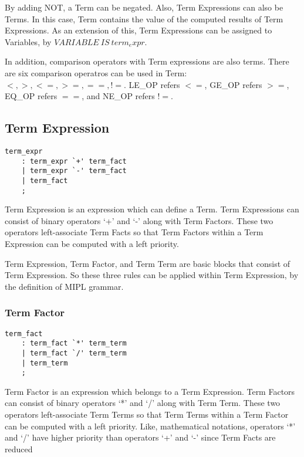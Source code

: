 \documentclass[prodmode,acmtecs]{acmsmall}
\begin{document}
By adding NOT, a Term can be negated. Also, Term Expressions can also be Terms.
In this case, Term contains the value of the computed results of Term Expressions.
As an extension of this, Term Expressions can be assigned to Variables,
by $VARIABLE\ IS\ term_expr$.
\medskip

In addition, comparison operators with Term expressions are also terms. There are six
comparison operatros can be used in Term: $<, >, <=, >=, ==, !=$. LE\_OP refers $<=$,
GE\_OP refers $>=$, EQ\_OP refers $==$, and NE\_OP refers $!=$.
\medskip


\subsection{Term Expression}
\begin{lstlisting}
term_expr
	: term_expr `+' term_fact
	| term_expr `-' term_fact
	| term_fact
	;
\end{lstlisting}

Term Expression is an expression which can define a Term.  Term 
Expressions can consist of binary operators `+' and `-' along with Term
Factors. These two operators left-associate Term Facts so that Term
Factors within a Term Expression can be computed with a left priority.

Term Expression, Term Factor, and Term Term are basic blocks that
consist of Term Expression.  So these three rules can be applied within
Term Expression, by the definition of MIPL grammar.
\medskip

\subsubsection{Term Factor}

\begin{lstlisting}
term_fact
	: term_fact `*' term_term
	| term_fact `/' term_term
	| term_term
	;
\end{lstlisting}

Term Factor is an expression which belongs to a Term Expression.  Term 
Factors can consist of binary operators `*' and `/' along with Term
Term.  These two operators left-associate Term Terms so that Term
Terms within a Term Factor can be computed with a left priority. Like,
mathematical notations, operators `*' and `/' have higher priority than
operators `+' and `-' since Term Facts are reduced 
\medskip
\end{document}
